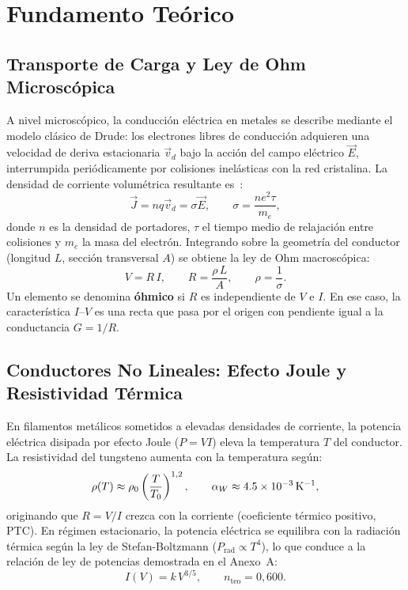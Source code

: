 
\section{Fundamento Teórico}
\label{sec:fundamento}

\subsection{Transporte de Carga y Ley de Ohm Microscópica}

A nivel microscópico, la conducción eléctrica en metales se describe mediante el modelo clásico de Drude: los electrones libres de conducción adquieren una velocidad de deriva estacionaria $\vec{v}_d$ bajo la acción del campo eléctrico $\vec{E}$, interrumpida periódicamente por colisiones inelásticas con la red cristalina. La densidad de corriente volumétrica resultante es~\cite{serway, halliday}:
\begin{equation}
    \vec{J} = nq\vec{v}_d = \sigma\vec{E}, \qquad \sigma = \frac{ne^2\tau}{m_e},
    \label{eq:conductividad_drude}
\end{equation}
donde $n$ es la densidad de portadores, $\tau$ el tiempo medio de relajación entre colisiones y $m_e$ la masa del electrón. Integrando sobre la geometría del conductor (longitud $L$, sección transversal $A$) se obtiene la ley de Ohm macroscópica:
\begin{equation}
    V = R\,I, \qquad R = \frac{\rho\,L}{A}, \qquad \rho = \frac{1}{\sigma}.
    \label{eq:ohm_macro}
\end{equation}
Un elemento se denomina \textbf{óhmico} si $R$ es independiente de $V$ e $I$. En ese caso, la característica $I$--$V$ es una recta que pasa por el origen con pendiente igual a la conductancia $G = 1/R$.

\subsection{Conductores No Lineales: Efecto Joule y Resistividad Térmica}

En filamentos metálicos sometidos a elevadas densidades de corriente, la potencia eléctrica disipada por efecto Joule ($P = VI$) eleva la temperatura $T$ del conductor. La resistividad del tungsteno aumenta con la temperatura según:
\begin{equation}
    \rho(T) \approx \rho_0 \left(\frac{T}{T_0}\right)^{1{,}2}, \qquad \alpha_W \approx \qty{4{,}5e-3}{\per\kelvin},
    \label{eq:resistividad_tungsteno}
\end{equation}
originando que $R = V/I$ crezca con la corriente (coeficiente térmico positivo, PTC). En régimen estacionario, la potencia eléctrica se equilibra con la radiación térmica según la ley de Stefan-Boltzmann ($P_{\text{rad}} \propto T^4$), lo que conduce a la relación de ley de potencias demostrada en el Anexo~A:
\begin{equation}
    \boxed{I(V) = k\,V^{3/5}, \qquad n_{\text{teo}} = 0{,}600.}
    \label{eq:ley_potencias_foquito}
\end{equation}

